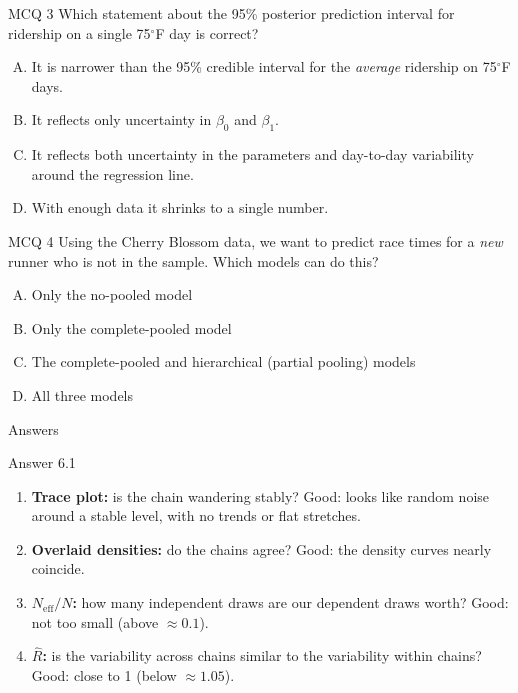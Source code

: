 \documentclass[aspectratio=43,11pt]{beamer}
\newcommand{\divider}[2]{%
  \begin{frame}
    \centering
    {\Large #1}\\[0.6em]
    {\normalsize #2}
  \end{frame}}
\begin{document}
\begin{frame}{MCQ 3}
  Which statement about the 95\% posterior prediction interval for
  ridership on a single 75$^\circ$F day is correct?
  \vspace{0.6em}
  \begin{enumerate}[(A)]
    \item It is narrower than the 95\% credible interval for the
      \emph{average} ridership on 75$^\circ$F days.
    \item It reflects only uncertainty in $\beta_0$ and $\beta_1$.
    \item It reflects both uncertainty in the parameters and day-to-day
      variability around the regression line.
    \item With enough data it shrinks to a single number.
  \end{enumerate}
\end{frame}

\begin{frame}{MCQ 4}
  Using the Cherry Blossom data, we want to predict race times for a
  \emph{new} runner who is not in the sample. Which models can do this?
  \vspace{0.6em}
  \begin{enumerate}[(A)]
    \item Only the no-pooled model
    \item Only the complete-pooled model
    \item The complete-pooled and hierarchical (partial pooling) models
    \item All three models
  \end{enumerate}
\end{frame}

\divider{Answers}{}

\begin{frame}{Answer 6.1}
  \begin{enumerate}
    \item \textbf{Trace plot:} is the chain wandering stably? Good: looks
      like random noise around a stable level, with no trends or flat
      stretches.
    \item \textbf{Overlaid densities:} do the chains agree? Good: the
      density curves nearly coincide.
    \item \textbf{$N_{\text{eff}}/N$:} how many independent draws are our
      dependent draws worth? Good: not too small (above $\approx 0.1$).
    \item \textbf{$\hat R$:} is the variability across chains similar to the
      variability within chains? Good: close to 1 (below $\approx 1.05$).
  \end{enumerate}
\end{frame}
\end{document}

